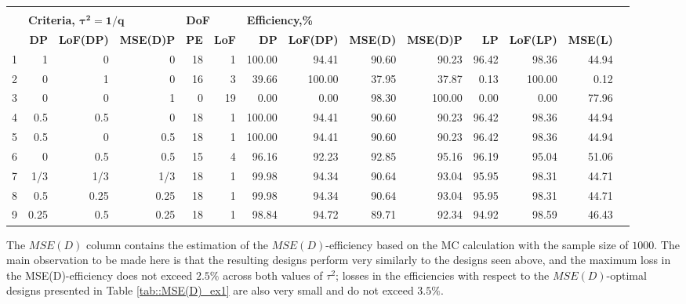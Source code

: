 \begin{table}[h]
{\begin{tabular}{rrrrrrrrrrrrrr}
 & & & & & & & & & & & & \\
   & \multicolumn{3}{l}{\textbf{Criteria, $\bm{\tau^2=1/q}$}} & \multicolumn{2}{l}{\textbf{DoF}} & \multicolumn{6}{l}{\textbf{Efficiency,\%}}                               \\
   & \textbf{DP}       & \textbf{LoF(DP)}    & \textbf{MSE(D)P} & \textbf{PE}        & \textbf{LoF}        & \textbf{DP}   & \textbf{LoF(DP)}   & \textbf{MSE(D)} & \textbf{MSE(D)P} & \textbf{LP}       & \textbf{LoF(LP)}   & \textbf{MSE(L)}  \\
1 & 1    & 0    & 0    & \multicolumn{1}{|r}{18} & \multicolumn{1}{r|}{1} & 100.00 & 94.41  & 90.60 & \multicolumn{1}{|r}{90.23}  & \multicolumn{1}{|r}{96.42} & 98.36 & 44.94 \\
2 & 0    & 1    & 0    & \multicolumn{1}{|r}{16} & \multicolumn{1}{r|}{3} & 39.66  & 100.00 & 37.95 & \multicolumn{1}{|r}{37.87}  & \multicolumn{1}{|r}{0.13}  & 100.00 & 0.12  \\
3 & 0    & 0    & 1    & \multicolumn{1}{|r}{0} & \multicolumn{1}{r|}{19} & 0.00   & 0.00   & 98.30 & \multicolumn{1}{|r}{100.00} & \multicolumn{1}{|r}{0.00}  & 0.00  & 77.96 \\
4 & 0.5  & 0.5  & 0    & \multicolumn{1}{|r}{18} & \multicolumn{1}{r|}{1}  & 100.00 & 94.41  & 90.60 & \multicolumn{1}{|r}{90.23}  & \multicolumn{1}{|r}{96.42} & 98.36 & 44.94 \\
5 & 0.5  & 0    & 0.5  & \multicolumn{1}{|r}{18} & \multicolumn{1}{r|}{1} & 100.00 & 94.41  & 90.60 & \multicolumn{1}{|r}{90.23} & \multicolumn{1}{|r}{96.42} & 98.36 & 44.94 \\
6 & 0    & 0.5  & 0.5  & \multicolumn{1}{|r}{15} & \multicolumn{1}{r|}{4} & 96.16  & 92.23  & 92.85 & \multicolumn{1}{|r}{95.16}  & \multicolumn{1}{|r}{96.19} & 95.04 & 51.06 \\
7 & 1/3  & 1/3  & 1/3  & \multicolumn{1}{|r}{18} & \multicolumn{1}{r|}{1} & 99.98  & 94.34  & 90.64 & \multicolumn{1}{|r}{93.04}  & \multicolumn{1}{|r}{95.95} & 98.31 & 44.71 \\
8 & 0.5  & 0.25 & 0.25 & \multicolumn{1}{|r}{18} & \multicolumn{1}{r|}{1} & 99.98  & 94.34  & 90.64 & \multicolumn{1}{|r}{93.04}  & \multicolumn{1}{|r}{95.95} & 98.31 & 44.71 \\
9 & 0.25 & 0.5  & 0.25 & \multicolumn{1}{|r}{18} & \multicolumn{1}{r|}{1} & 98.84  & 94.72  & 89.71 & \multicolumn{1}{|r}{92.34}  & \multicolumn{1}{|r}{94.92} & 98.59 & 46.43
\end{tabular}
}
\end{table}
The $MSE(D)$ column contains the estimation of the $MSE(D)$-efficiency based on the MC calculation with the sample size of $1000$. The main observation to be made here is that the resulting designs perform very similarly to the designs seen above, and the maximum loss in the MSE(D)-efficiency does not exceed $2.5\%$ across both values of $\tau^2$; losses in the efficiencies with respect to the $MSE(D)$-optimal designs presented in Table \ref{tab::MSE(D)_ex1} are also very small and do not exceed $3.5\%$.

